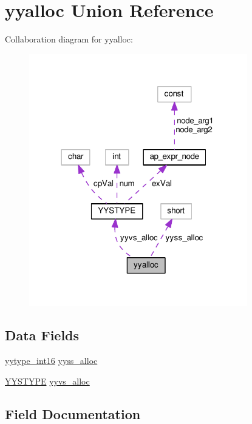 \hypertarget{unionyyalloc}{}\section{yyalloc Union Reference}
\label{unionyyalloc}


Collaboration diagram for yyalloc\+:
\nopagebreak
\begin{figure}[H]
\begin{center}
\leavevmode
\includegraphics[width=269pt]{unionyyalloc__coll__graph}
\end{center}
\end{figure}
\subsection*{Data Fields}
\begin{DoxyCompactItemize}
\item 
\hyperlink{util__expr__parse_8c_ade5b97f0021a4f6c5922ead3744ab297}{yytype\+\_\+int16} \hyperlink{unionyyalloc_a4800e0520a89a4789afa7b5d82197e65}{yyss\+\_\+alloc}
\item 
\hyperlink{unionYYSTYPE}{Y\+Y\+S\+T\+Y\+PE} \hyperlink{unionyyalloc_a9326f4fdc6f737a929444427836d8928}{yyvs\+\_\+alloc}
\end{DoxyCompactItemize}


\subsection{Field Documentation}
